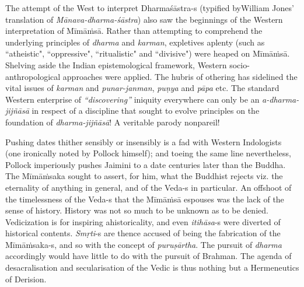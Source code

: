 The attempt of the West to interpret Dharmaśāstra-s (typified by\break William Jones’ translation of \textit{Mānava-dharma-śāstra}) also saw the beginnings of the Western interpretation of Mīmāṁsā. Rather than attempting to comprehend the underlying principles of \textit{dharma} and \textit{karman}, expletives aplenty (such as ``atheistic", ``oppressive", ``ritualistic" and ``divisive") were heaped on Mīmāṁsā. Shelving aside the Indian epistemological framework, Western socio-anthropological approaches were applied. The hubris of othering has sidelined the vital issues of \textit{karman} and \textit{punar-janman}, \textit{puṇya} and \textit{pāpa} etc. The standard Western enterprise of \textit{“discovering”} iniquity everywhere can only be an \textit{a-dharma-jijñāsā} in respect of a discipline that sought to evolve principles on the foundation of \textit{dharma-jijñāsā}! A veritable parody nonpareil!

Pushing dates thither sensibly or insensibly is a fad with Western Indologists (one ironically noted by Pollock himself); and toeing the same line nevertheless, Pollock imperiously pushes Jaimini to a date centuries later than the Buddha. The Mīmāṁsaka sought to assert, for him, what the Buddhist rejects viz. the eternality of anything in general, and of the Veda-s in particular. An offshoot of the timelessness of the Veda-s that the Mīmāṁsā espouses was the lack of the sense of history. History was not so much to be unknown as to be denied. Vedicization is for inspiring ahistoricality, and even \textit{itihāsa}-s were diverted of historical contents. \textit{Smṛti}-s are thence accused of being the fabrication of the Mīmāṁsaka-s, and so with the concept of \textit{puruṣārtha}. The pursuit of \textit{dharma} accordingly would have little to do with the pursuit of Brahman. The agenda of desacralisation and secularisation of the Vedic is thus nothing but a Hermeneutics of Derision.

